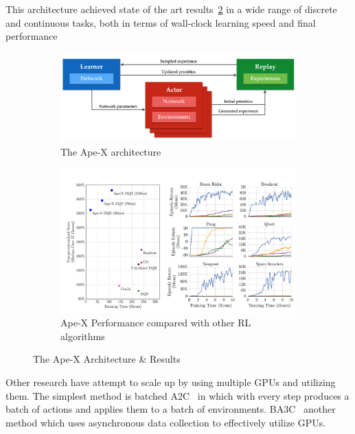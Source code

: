 This architecture achieved state of the art results~\ref{fig:apex_results} in a wide range of discrete and continuous tasks, both in terms of wall-clock learning speed and final performance

\begin{figure}[H]
	\centering
	\begin{subfigure}[b]{0.4\textwidth}
		\centering
		\includegraphics[width=\textwidth]{figures/algos/apex.png}
		\caption{The Ape-X architecture}
		\label{fig:apex_arch}
    \end{subfigure}
    \hfill
	\begin{subfigure}[b]{0.4\textwidth}
		\centering
		\includegraphics[width=\textwidth]{figures/algos/apex_results.png}
        \caption{Ape-X Performance compared with other RL algorithms}
		\label{fig:apex_results}
	\end{subfigure}
	\hfill
	   \caption{The Ape-X Architecture \& Results}
	   \label{fig:apex}
\end{figure}

Other research have attempt to scale up by using multiple GPUs and utilizing them. The simplest method is batched A2C~\parencite{clemente2017efficient} in which with every step produces a batch of actions and applies them to a batch of environments. BA3C~\parencite{babaeizadeh2016ga3c} another method which uses asynchronous data collection to effectively utilize GPUs.

